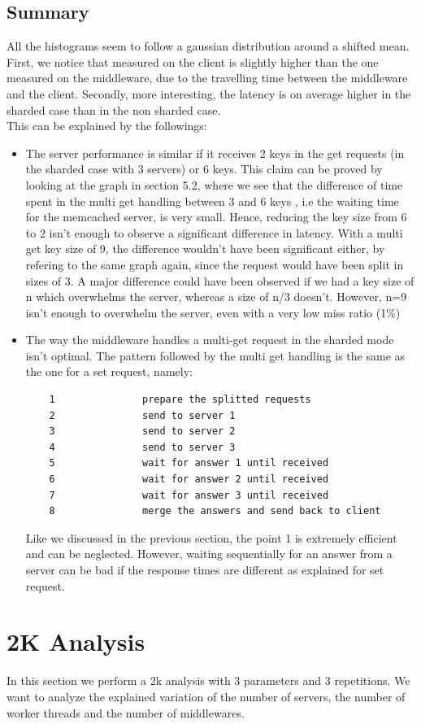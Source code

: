 \documentclass[11pt,a4paper]{article}
\begin{document}
\subsection{Summary}

All the histograms seem to follow a gaussian distribution around a shifted mean. First, we notice that measured on the client is slightly higher than the one measured on the middleware, due to the travelling time between the middleware and the client. Secondly, more interesting, the latency is on average higher in the sharded case than in the non sharded case. 
\\
This can be explained by the followings: 
\begin{itemize}
\item The server performance is similar if it receives 2 keys in the get requests (in the sharded case with 3 servers) or 6 keys. This claim can be proved by looking at the graph in section 5.2, where we see that the difference of time spent in the multi get handling between 3 and 6 keys , i.e the waiting time for the memcached server, is very small. Hence, reducing the key size from 6 to 2 isn't enough to observe a significant difference in latency. 
With a multi get key size of 9, the difference wouldn't have been significant either, by refering to the same graph again, since the request would have been split in sizes of 3. A major difference could have been observed if we had a key size of n which overwhelms the server, whereas a size of n/3 doesn't. However, n=9 isn't enough to overwhelm the server, even with a very low miss ratio (1\%)
\item The way the middleware handles a multi-get request in the sharded mode isn't optimal. The pattern followed by the multi get handling is the same as the one for a set request, namely: 
\begin{lstlisting}
	1				prepare the splitted requests
	2				send to server 1
	3				send to server 2
	4				send to server 3
	5				wait for answer 1 until received
	6				wait for answer 2 until received
	7				wait for answer 3 until received
	8				merge the answers and send back to client
\end{lstlisting}
Like we discussed in the previous section, the point 1 is extremely efficient and can be neglected. However, waiting sequentially for an answer from a server can be bad if the response times are different as explained for set request. 
\end{itemize}  

\newpage
\section{2K Analysis}
In this section we perform a 2k analysis with 3 parameters and 3 repetitions. We want to analyze the explained variation of the number of servers, the number of worker threads and the number of middlewares. 
\end{document}
